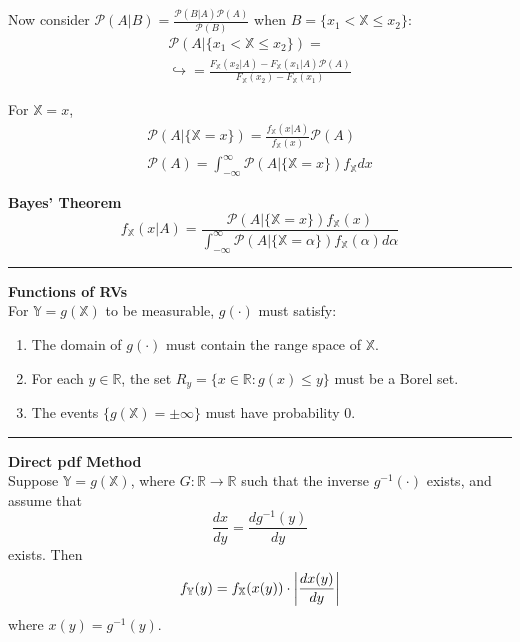 \documentclass{article}
\DeclarePairedDelimiter\abs{\lvert}{\rvert}
\renewcommand{\P}{\mathcal{P}}
\providecommand{\X}{\mathbb{X}}
\providecommand{\Y}{\mathbb{Y}}
\providecommand{\R}{\mathbb{R}}
\begin{document}
\begin{multicols*}{3}
        \newpage
        Now consider $\P(A|B) = \frac{\P(B|A)\P(A)}{\P(B)}$ when $B=\{x_1<\X\leq x_2\}$:
        \begin{equation*}
            \begin{gathered}
                \P(A|\{x_1<\X\leq x_2\}) = \\
                \hookrightarrow = \frac{F_\X (x_2|A) - F_\X (x_1|A)\P(A)}{F_\X(x_2) - F_\X(x_1)}
            \end{gathered}
        \end{equation*}

        For $\X=x$,
        \begin{equation*}
            \begin{gathered}
                \P(A|\{\X=x\}) = \frac{f_\X(x|A)}{f_\X(x)}\P(A)\\
                \P(A)= \int_{-\infty}^{\infty} \P(A|\{\X=x\})f_{\X}dx
            \end{gathered}
        \end{equation*}

        \textbf{Bayes' Theorem}
        \begin{equation*}
            f_{\X}(x|A) = \frac{\P(A|\{\X=x\})f_\X(x)}{\int_{-\infty}^{\infty}\P(A|\{\X=\alpha\})f_\X(\alpha)d\alpha }
        \end{equation*}

        \noindent\rule{\columnwidth}{0.4pt}

        \textbf{Functions of RVs}\\
        For $\Y=g(\X)$ to be measurable, $g(\cdot)$ must satisfy:
        \begin{enumerate}
            \item The domain of $g(\cdot)$ must contain the range space of $\X$.
            \item For each $y\in\R$, the set $R_y = \{x\in\R:g(x)\leq y\}$ must be a Borel set.
            \item The events $\{g(\X)=\pm\infty\}$ must have probability 0.
        \end{enumerate}

        \noindent\rule{\columnwidth}{0.4pt}

        \textbf{Direct pdf Method}\\
        Suppose $\Y=g(\X)$, where $G:\R\rightarrow\R$ such that the inverse $g^{-1}(\cdot)$ exists, and assume that
        \begin{equation*}
            \frac{dx}{dy} = \frac{dg^{-1}(y)}{dy}
        \end{equation*}
        exists.
        Then
        \begin{equation*}
            f_\Y(y) = f_\X(x(y)) \cdot \abs*{\frac{dx(y)}{dy}}
        \end{equation*}
        where $x(y)=g^{-1}(y)$.


\end{multicols*}
\end{document}
